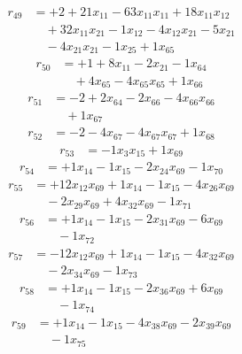\[\begin{aligned}
r_{49} &= + 2 + 21 x_{11} - 63 x_{11} x_{11} + 18 x_{11} x_{12} \\
 &\quad + 32 x_{11} x_{21} - 1 x_{12} - 4 x_{12} x_{21} - 5 x_{21} \\
 &\quad - 4 x_{21} x_{21} - 1 x_{25} + 1 x_{65}
\end{aligned}\]
\[\begin{aligned}
r_{50} &= + 1 + 8 x_{11} - 2 x_{21} - 1 x_{64} \\
 &\quad + 4 x_{65} - 4 x_{65} x_{65} + 1 x_{66}
\end{aligned}\]
\[\begin{aligned}
r_{51} &= - 2 + 2 x_{64} - 2 x_{66} - 4 x_{66} x_{66} \\
 &\quad + 1 x_{67}
\end{aligned}\]
\[\begin{aligned}
r_{52} &= - 2 - 4 x_{67} - 4 x_{67} x_{67} + 1 x_{68}
\end{aligned}\]
\[\begin{aligned}
r_{53} &= - 1 x_{3} x_{15} + 1 x_{69}
\end{aligned}\]
\[\begin{aligned}
r_{54} &= + 1 x_{14} - 1 x_{15} - 2 x_{24} x_{69} - 1 x_{70}
\end{aligned}\]
\[\begin{aligned}
r_{55} &= + 12 x_{12} x_{69} + 1 x_{14} - 1 x_{15} - 4 x_{26} x_{69} \\
 &\quad - 2 x_{29} x_{69} + 4 x_{32} x_{69} - 1 x_{71}
\end{aligned}\]
\[\begin{aligned}
r_{56} &= + 1 x_{14} - 1 x_{15} - 2 x_{31} x_{69} - 6 x_{69} \\
 &\quad - 1 x_{72}
\end{aligned}\]
\[\begin{aligned}
r_{57} &= - 12 x_{12} x_{69} + 1 x_{14} - 1 x_{15} - 4 x_{32} x_{69} \\
 &\quad - 2 x_{34} x_{69} - 1 x_{73}
\end{aligned}\]
\[\begin{aligned}
r_{58} &= + 1 x_{14} - 1 x_{15} - 2 x_{36} x_{69} + 6 x_{69} \\
 &\quad - 1 x_{74}
\end{aligned}\]
\[\begin{aligned}
r_{59} &= + 1 x_{14} - 1 x_{15} - 4 x_{38} x_{69} - 2 x_{39} x_{69} \\
 &\quad - 1 x_{75}
\end{aligned}\]
